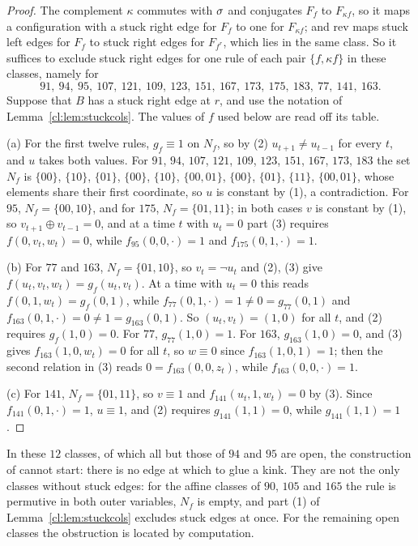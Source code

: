 \begin{proof}
The complement $\kappa$ commutes with $\sigma$ and conjugates $F_f$ to $F_{\kappa f}$, so it maps a configuration with a stuck right edge for $F_f$ to one for $F_{\kappa f}$; and $\mathrm{rev}$ maps stuck left edges for $F_f$ to stuck right edges for $F_{f^r}$, which lies in the same class. So it suffices to exclude stuck right edges for one rule of each pair $\{f,\kappa f\}$ in these classes, namely for
\[
91,\ 94,\ 95,\ 107,\ 121,\ 109,\ 123,\ 151,\ 167,\ 173,\ 175,\ 183,\ 77,\ 141,\ 163.
\]
Suppose that $B$ has a stuck right edge at $r$, and use the notation of Lemma~\ref{cl:lem:stuckcols}. The values of $f$ used below are read off its table.

(a) For the first twelve rules, $g_f\equiv1$ on $N_f$, so by (2) $u_{t+1}\ne u_{t-1}$ for every $t$, and $u$ takes both values. For $91$, $94$, $107$, $121$, $109$, $123$, $151$, $167$, $173$, $183$ the set $N_f$ is $\{00\}$, $\{10\}$, $\{01\}$, $\{00\}$, $\{10\}$, $\{00,01\}$, $\{00\}$, $\{01\}$, $\{11\}$, $\{00,01\}$, whose elements share their first coordinate, so $u$ is constant by (1), a contradiction. For $95$, $N_f=\{00,10\}$, and for $175$, $N_f=\{01,11\}$; in both cases $v$ is constant by (1), so $v_{t+1}\oplus v_{t-1}=0$, and at a time $t$ with $u_t=0$ part (3) requires $f(0,v_t,w_t)=0$, while $f_{95}(0,0,\cdot)=1$ and $f_{175}(0,1,\cdot)=1$.

(b) For $77$ and $163$, $N_f=\{01,10\}$, so $v_t=\neg u_t$ and (2), (3) give $f(u_t,v_t,w_t)=g_f(u_t,v_t)$. At a time with $u_t=0$ this reads $f(0,1,w_t)=g_f(0,1)$, while $f_{77}(0,1,\cdot)=1\ne0=g_{77}(0,1)$ and $f_{163}(0,1,\cdot)=0\ne1=g_{163}(0,1)$. So $(u_t,v_t)=(1,0)$ for all $t$, and (2) requires $g_f(1,0)=0$. For $77$, $g_{77}(1,0)=1$. For $163$, $g_{163}(1,0)=0$, and (3) gives $f_{163}(1,0,w_t)=0$ for all $t$, so $w\equiv0$ since $f_{163}(1,0,1)=1$; then the second relation in (3) reads $0=f_{163}(0,0,z_t)$, while $f_{163}(0,0,\cdot)=1$.

(c) For $141$, $N_f=\{01,11\}$, so $v\equiv1$ and $f_{141}(u_t,1,w_t)=0$ by (3). Since $f_{141}(0,1,\cdot)=1$, $u\equiv1$, and (2) requires $g_{141}(1,1)=0$, while $g_{141}(1,1)=1$.
\end{proof}

In these $12$ classes, of which all but those of $94$ and $95$ are open, the construction of \cite{PaperA} cannot start: there is no edge at which to glue a kink. They are not the only classes without stuck edges: for the affine classes of $90$, $105$ and $165$ the rule is permutive in both outer variables, $N_f$ is empty, and part (1) of Lemma~\ref{cl:lem:stuckcols} excludes stuck edges at once. For the remaining open classes the obstruction is located by computation.

